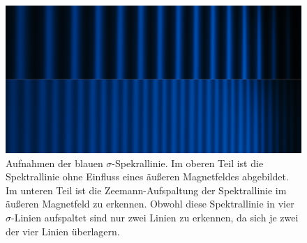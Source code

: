 \FloatBarrier
\begin{figure}[!h]
\centering
\includegraphics[scale=0.1]{../Grafiken/3-I0_t8_sigma_4-I5_t8_sigma.jpg}
\caption{Aufnahmen der blauen $\sigma$-Spekrallinie. Im oberen Teil ist die
        Spektrallinie ohne Einfluss eines äußeren Magnetfeldes abgebildet.
        Im unteren Teil ist die Zeemann-Aufspaltung der Spektrallinie
        im äußeren Magnetfeld zu erkennen.
        Obwohl diese Spektrallinie in vier $\sigma$-Linien aufspaltet sind nur
        zwei Linien zu erkennen, da sich je zwei der vier Linien überlagern. 
        \label{fig:3-i0_t8_sigma_4-i5_t8_sigma}}
\end{figure}
\FloatBarrier
